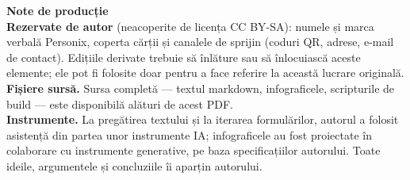 \clearpage
\thispagestyle{empty}
\begin{flushleft}\small\sffamily
\textbf{Note de producție}\\[1.2em]

\textbf{Rezervate de autor} (neacoperite de licența CC BY-SA): numele și
marca verbală Personix, coperta cărții și canalele de sprijin (coduri QR,
adrese, e-mail de contact). Edițiile derivate trebuie să înlăture sau să
înlocuiască aceste elemente; ele pot fi folosite doar pentru a face referire
la această lucrare originală.\\[1.2em]

\textbf{Fișiere sursă.} Sursa completă --- textul markdown, infograficele,
scripturile de build --- este disponibilă alături de acest PDF.\\[1.2em]

\textbf{Instrumente.} La pregătirea textului și la iterarea formulărilor,
autorul a folosit asistență din partea unor instrumente IA; infograficele
au fost proiectate în colaborare cu instrumente generative, pe baza
specificațiilor autorului. Toate ideile, argumentele și concluziile îi
aparțin autorului.
\end{flushleft}
\clearpage

